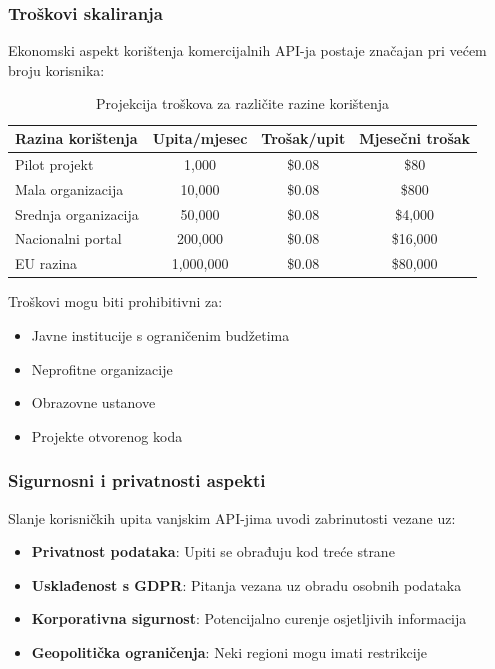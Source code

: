 \subsubsection{Troškovi skaliranja}

Ekonomski aspekt korištenja komercijalnih API-ja postaje značajan pri većem broju korisnika:

\begin{table}[htbp]
\centering
\caption{Projekcija troškova za različite razine korištenja}
\label{tab:cost_projection}
\begin{tabular}{|l|c|c|c|}
\hline
\textbf{Razina korištenja} & \textbf{Upita/mjesec} & \textbf{Trošak/upit} & \textbf{Mjesečni trošak} \\
\hline
Pilot projekt & 1,000 & \$0.08 & \$80 \\
Mala organizacija & 10,000 & \$0.08 & \$800 \\
Srednja organizacija & 50,000 & \$0.08 & \$4,000 \\
Nacionalni portal & 200,000 & \$0.08 & \$16,000 \\
EU razina & 1,000,000 & \$0.08 & \$80,000 \\
\hline
\end{tabular}
\end{table}

Troškovi mogu biti prohibitivni za:
\begin{itemize}
    \item Javne institucije s ograničenim budžetima
    \item Neprofitne organizacije
    \item Obrazovne ustanove
    \item Projekte otvorenog koda
\end{itemize}

\subsubsection{Sigurnosni i privatnosti aspekti}

Slanje korisničkih upita vanjskim API-jima uvodi zabrinutosti vezane uz:

\begin{itemize}
    \item \textbf{Privatnost podataka}: Upiti se obrađuju kod treće strane
    \item \textbf{Usklađenost s GDPR}: Pitanja vezana uz obradu osobnih podataka
    \item \textbf{Korporativna sigurnost}: Potencijalno curenje osjetljivih informacija
    \item \textbf{Geopolitička ograničenja}: Neki regioni mogu imati restrikcije
\end{itemize}


